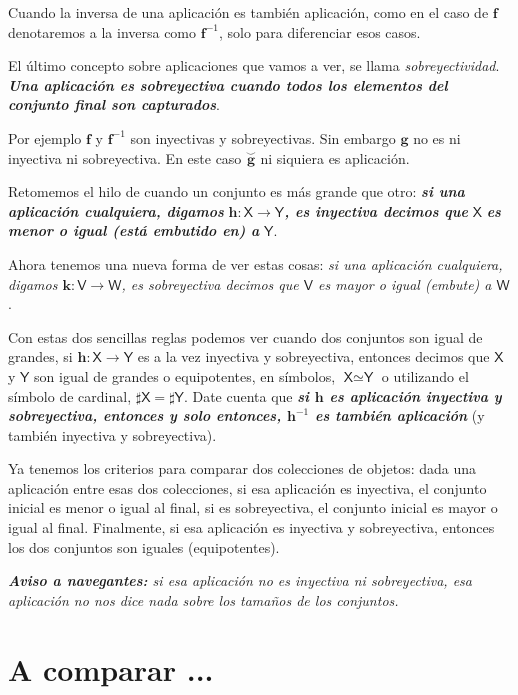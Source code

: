 \documentclass{amsart}
\theoremstyle{definition}
\theoremstyle{remark}
\numberwithin{equation}{section}
\newcommand{\fromto}{\longrightarrow}
\newcommand{\setsymbol}[1]{\textsf{#1}}
\newcommand{\sV}{\setsymbol{V}}
\newcommand{\sW}{\setsymbol{W}}
\newcommand{\sX}{\setsymbol{X}}
\newcommand{\sY}{\setsymbol{Y}}
\newcommand{\monrel}[1]{\mathbf{#1}}
\newcommand{\monrelinv}[1]{\overset{\smallsmile}{\monrel{#1}}}
\newcommand{\funct}[1]{\monrel{#1}}
\newcommand{\functinv}[1]{{\funct{#1}}^{-1}}
\begin{document}
	Cuando la inversa de una aplicación es también aplicación, como en el 
caso de ${\funct{f}}$ denotaremos a la inversa como  ${\functinv{f}}$, solo 
para diferenciar esos casos. 
	
	
	El último concepto sobre aplicaciones que vamos a ver, se llama 
\emph{sobreyectividad}. \textbf{\emph{Una aplicación es sobreyectiva cuando 
todos los elementos del conjunto final son capturados}}.
	
	Por ejemplo $\funct{f}$ y ${\functinv{f}}$ son inyectivas y 
sobreyectivas. Sin embargo $\funct{g}$ no es ni inyectiva ni sobreyectiva. En 
este caso ${\monrelinv{g}}$ ni siquiera es aplicación.
	
	
	Retomemos el hilo de cuando un conjunto es más grande que otro: 
\textbf{\emph{si una aplicación cualquiera, digamos}} ${\funct{h}} : {\sX} 
\fromto {\sY}$\textbf{\emph{, es inyectiva decimos que }}${\sX}$ 
\textbf{\emph{es menor o igual (está embutido en) a }}${\sY}$.
	
	Ahora tenemos una nueva forma de ver estas cosas:  \textsf{\emph{si una 
aplicación cualquiera, digamos ${\funct{k}} : {\sV} \fromto {\sW}$, es 
sobreyectiva decimos que $\sV$ es mayor o igual (embute) a $\sW$}}.
	
	Con estas dos sencillas reglas podemos ver cuando dos conjuntos son igual 
de grandes, si ${\funct{h}} : {\sX} \fromto {\sY}$ es a la vez inyectiva y 
sobreyectiva, entonces decimos que $\sX$ y $\sY$ son igual de grandes o 
equipotentes, en símbolos, ${\sX}{\simeq}{\sY}$ o utilizando el símbolo de 
cardinal, $\sharp\sX = \sharp\sY$. Date cuenta que \textbf{\emph{si 
$\funct{h}$ es aplicación inyectiva y sobreyectiva, entonces y solo entonces, 
${\functinv{h}}$ es también aplicación}} (y también inyectiva y 
sobreyectiva).
	
	
	Ya tenemos los criterios para comparar dos colecciones de objetos: dada 
una aplicación entre esas dos colecciones, si esa aplicación es inyectiva, el 
conjunto inicial es menor o igual al final, si es sobreyectiva, el conjunto 
inicial es mayor o igual al final. Finalmente, si esa aplicación es inyectiva 
y sobreyectiva, entonces los dos conjuntos son iguales (equipotentes).




	\emph{\textbf{Aviso a navegantes:} si esa aplicación no es inyectiva ni 
sobreyectiva, esa aplicación no nos dice nada sobre los tamaños de los 
conjuntos.}


	\section{A comparar ...}
\end{document}
